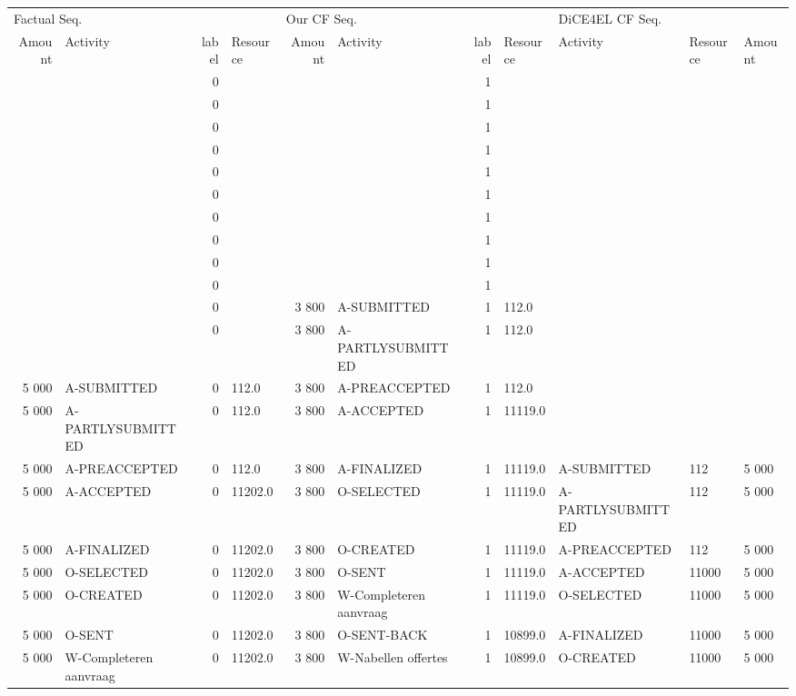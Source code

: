 \begin{tabular}{rlrlrlrllll}
\toprule
\multicolumn{4}{l}{Factual Seq.} & \multicolumn{4}{l}{Our CF Seq.} & \multicolumn{3}{l}{DiCE4EL CF Seq.} \\
Amount & Activity & label & Resource & Amount & Activity & label & Resource & Activity & Resource & Amount \\
\midrule
 &  & 0 &  &  &  & 1 &  &  &  &  \\
 &  & 0 &  &  &  & 1 &  &  &  &  \\
 &  & 0 &  &  &  & 1 &  &  &  &  \\
 &  & 0 &  &  &  & 1 &  &  &  &  \\
 &  & 0 &  &  &  & 1 &  &  &  &  \\
 &  & 0 &  &  &  & 1 &  &  &  &  \\
 &  & 0 &  &  &  & 1 &  &  &  &  \\
 &  & 0 &  &  &  & 1 &  &  &  &  \\
 &  & 0 &  &  &  & 1 &  &  &  &  \\
 &  & 0 &  &  &  & 1 &  &  &  &  \\
 &  & 0 &  & 3 800 & A-SUBMITTED & 1 & 112.0 &  &  &  \\
 &  & 0 &  & 3 800 & A-PARTLYSUBMITTED & 1 & 112.0 &  &  &  \\
5 000 & A-SUBMITTED & 0 & 112.0 & 3 800 & A-PREACCEPTED & 1 & 112.0 &  &  &  \\
5 000 & A-PARTLYSUBMITTED & 0 & 112.0 & 3 800 & A-ACCEPTED & 1 & 11119.0 &  &  &  \\
5 000 & A-PREACCEPTED & 0 & 112.0 & 3 800 & A-FINALIZED & 1 & 11119.0 & A-SUBMITTED & 112 & 5 000 \\
5 000 & A-ACCEPTED & 0 & 11202.0 & 3 800 & O-SELECTED & 1 & 11119.0 & A-PARTLYSUBMITTED & 112 & 5 000 \\
5 000 & A-FINALIZED & 0 & 11202.0 & 3 800 & O-CREATED & 1 & 11119.0 & A-PREACCEPTED & 112 & 5 000 \\
5 000 & O-SELECTED & 0 & 11202.0 & 3 800 & O-SENT & 1 & 11119.0 & A-ACCEPTED & 11000 & 5 000 \\
5 000 & O-CREATED & 0 & 11202.0 & 3 800 & W-Completeren aanvraag & 1 & 11119.0 & O-SELECTED & 11000 & 5 000 \\
5 000 & O-SENT & 0 & 11202.0 & 3 800 & O-SENT-BACK & 1 & 10899.0 & A-FINALIZED & 11000 & 5 000 \\
5 000 & W-Completeren aanvraag & 0 & 11202.0 & 3 800 & W-Nabellen offertes & 1 & 10899.0 & O-CREATED & 11000 & 5 000 \\

\end{tabular}
